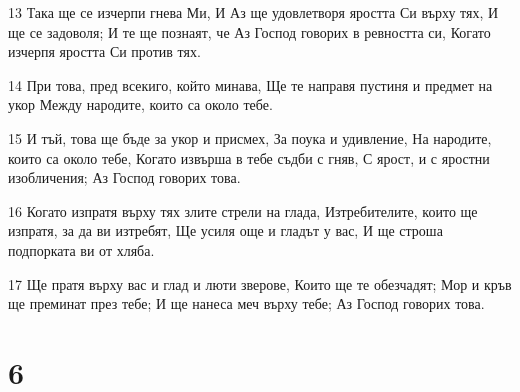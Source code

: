 \par 13 Така ще се изчерпи гнева Ми, И Аз ще удовлетворя яростта Си върху тях, И ще се задоволя; И те ще познаят, че Аз Господ говорих в ревността си, Когато изчерпя яростта Си против тях.
\par 14 При това, пред всекиго, който минава, Ще те направя пустиня и предмет на укор Между народите, които са около тебе.
\par 15 И тъй, това ще бъде за укор и присмех, За поука и удивление, На народите, които са около тебе, Когато извърша в тебе съдби с гняв, С ярост, и с яростни изобличения; Аз Господ говорих това.
\par 16 Когато изпратя върху тях злите стрели на глада, Изтребителите, които ще изпратя, за да ви изтребят, Ще усиля още и гладът у вас, И ще строша подпорката ви от хляба.
\par 17 Ще пратя върху вас и глад и люти зверове, Които ще те обезчадят; Мор и кръв ще преминат през тебе; И ще нанеса меч върху тебе; Аз Господ говорих това.

\chapter{6}

